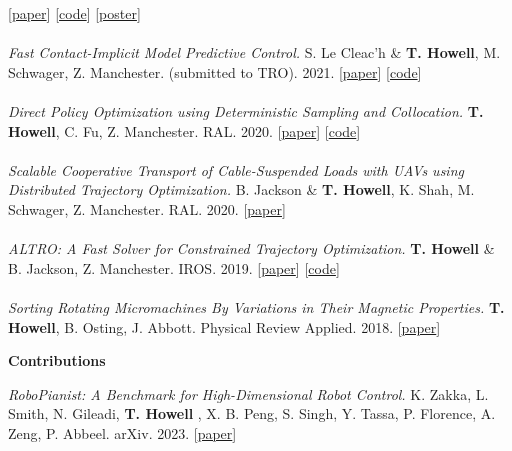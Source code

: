 \documentclass[10pt]{article}
\begin{document}
[\href{https://arxiv.org/abs/2109.04928}{paper}]
[\href{https://github.com/thowell/optimization_dynamics}{code}]
[\href{https://github.com/thowell/cv/blob/master/posters/optimization_dynamics_poster.pdf}{poster}]
\\
\\
\textit{Fast Contact-Implicit Model Predictive Control.} {\color{lightgray} S. Le Cleac'h \&} \textbf{T. Howell}{\color{lightgray}, M. Schwager, Z. Manchester. (submitted to TRO). 2021.}
[\href{https://arxiv.org/abs/2107.05616v2}{paper}]
[\href{https://github.com/thowell/ContactImplicitMPC.jl}{code}]
\\
\\
\textit{Direct Policy Optimization using Deterministic Sampling and Collocation.} \textbf{T. Howell}{\color{lightgray}, C. Fu, Z. Manchester. RAL. 2020.}
[\href{https://arxiv.org/abs/2010.08506v3}{paper}]
[\href{https://github.com/thowell/direct_policy_optimization}{code}]
\\
\\
\textit{Scalable Cooperative Transport of Cable-Suspended Loads with UAVs using Distributed Trajectory Optimization.} {\color{lightgray}B. Jackson \&} \textbf{T. Howell}{\color{lightgray}, K. Shah, M. Schwager, Z. Manchester. RAL. 2020.}
[\href{https://roboticexplorationlab.org/papers/distributed_quads.pdf}{paper}]
\\
\\
\textit{ALTRO: A Fast Solver for Constrained Trajectory Optimization.} \textbf{T. Howell} {\color{lightgray} \& B. Jackson, Z. Manchester. IROS. 2019.}
[\href{https://roboticexplorationlab.org/papers/altro-iros.pdf}{paper}]
[\href{https://github.com/RoboticExplorationLab/TrajectoryOptimization.jl}{code}]
\\
\\
\textit{Sorting Rotating Micromachines By Variations in Their Magnetic Properties.} \textbf{T. Howell}{\color{lightgray}, B. Osting, J. Abbott. Physical Review Applied. 2018.}
[\href{https://journals.aps.org/prapplied/pdf/10.1103/PhysRevApplied.9.054021}{paper}]
\\
\begin{center} \textbf{Contributions} \end{center}
\textit{RoboPianist: A Benchmark for High-Dimensional Robot Control.} {\color{lightgray} K. Zakka, L. Smith, N. Gileadi,} \textbf{T. Howell} {\color{lightgray}, X. B. Peng, S. Singh, Y. Tassa, P. Florence, A. Zeng, P. Abbeel. arXiv. 2023.}
[\href{https://arxiv.org/abs/2304.04150}{paper}]
\\
\end{document}

